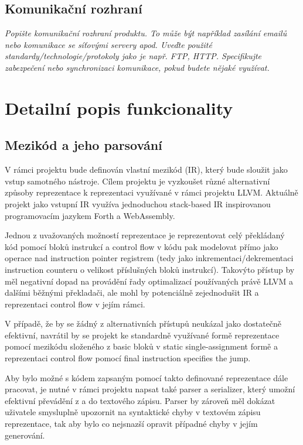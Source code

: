 \documentclass{article}
\def\xxx#1{\textcolor{red!50}{\itshape #1}}
\begin{document}
\subsection{Komunikační rozhraní}

\xxx{Popište komunikační rozhraní produktu. To může být například zasílání emailů nebo komunikace se síťovými servery apod. Uveďte použité standardy/technologie/protokoly jako je např. FTP, HTTP. Specifikujte zabezpečení nebo synchronizaci komunikace, pokud budete nějaké využívat.}
\fi

\section{Detailní popis funkcionality}


\subsection{Mezikód a jeho parsování}

V rámci projektu bude definován vlastní mezikód (IR), který bude sloužit jako vstup samotného nástroje. Cílem projektu je vyzkoušet různé alternativní způsoby reprezentace k reprezentaci využívané v rámci projektu LLVM. Aktuálně projekt jako vstupní IR využíva jednoduchou stack-based IR inspirovanou programovacím jazykem Forth a WebAssembly.

Jednou z uvažovaných možností reprezentace je reprezentovat celý překládaný kód pomocí bloků instrukcí a control flow v kódu pak modelovat přímo jako operace nad instruction pointer registrem (tedy jako inkrementaci/dekrementaci instruction counteru o velikost příslušných bloků instrukcí). Takovýto přístup by měl negativní dopad na provádění řady optimalizací používaných právě LLVM a dalšími běžnými překladači, ale mohl by potenciálně zejednodušit IR a reprezentaci control flow v jejím rámci.

V případě, že by se žádný z alternativních přístupů neukázal jako dostatečně efektivní, navrátil by se projekt ke standardně využívané formě reprezentace pomocí mezikódu složeného z basic bloků v static single-assignment formě a reprezentaci control flow pomocí final instruction specifies the jump.

Aby bylo možné s kódem zapsaným pomocí takto definované reprezentace dále pracovat, je nutné v rámci projektu napsat také parser a serializer, který umožní efektivní převádění z a do textového zápisu. Parser by zároveň měl dokázat uživatele smysluplně upozornit na syntaktické chyby v textovém zápisu reprezentace, tak aby bylo co nejsnazší opravit případné chyby v jejím generování.
\end{document}
